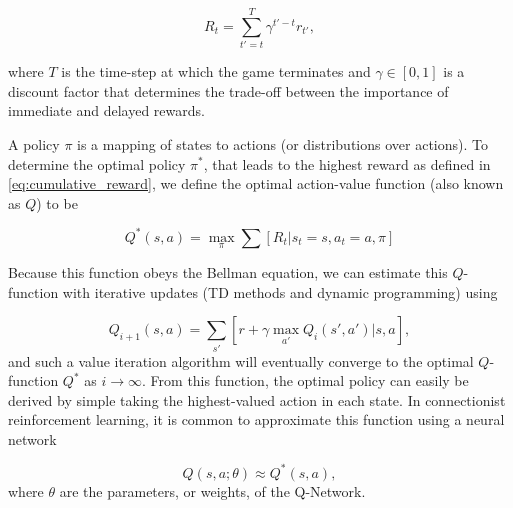 \begin{equation}\label{eq:cumulative_reward}
	R_t = \sum_{t'=t}^{T} \gamma^{t'-t} r_{t'},
\end{equation}

where $T$ is the time-step at which the game terminates and $\gamma \in [0,1]$ is a discount factor that determines the trade-off between the importance of immediate and delayed rewards. 

A policy $\pi$ is a mapping of states to actions (or distributions over actions). To determine the optimal policy $\pi^*$, that leads to the highest reward as defined in \eqref{eq:cumulative_reward}, we define the optimal action-value function (also known as $Q$) to be

\begin{equation}\label{qfunction}
	Q^*(s, a) = \max_\pi \sum [R_t \vert s_t=s, a_t=a, \pi]
\end{equation}

Because this function obeys the Bellman equation, we can estimate this $Q$-function with iterative updates (TD methods and dynamic programming) using

\begin{equation}
	Q_{i+1}(s, a) = \sum_{s'} [r + \gamma \max_{a'} Q_i(s', a') \vert s, a],
\end{equation}
and such a value iteration algorithm will eventually converge to the optimal $Q$-function $Q^*$ as $i \rightarrow \infty$. From this function, the optimal policy can easily be derived by simple taking the highest-valued action in each state. In connectionist reinforcement learning, it is common to approximate this function using a neural network

\begin{equation}
	Q(s, a; \theta) \approx Q^*(s, a),
\end{equation}
where $\theta$ are the parameters, or weights, of the Q-Network.